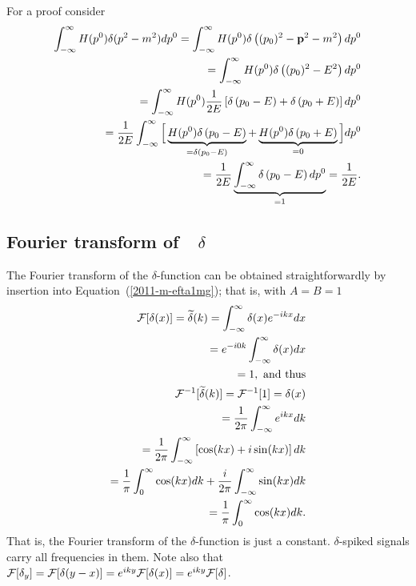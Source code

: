 {\color{OliveGreen}
\bproof
For a proof consider
 \begin{equation}
 \begin{split}
\int_{-\infty}^\infty     H (p^0)\delta (p^2-m^2)  dp^0
=
\int_{-\infty}^\infty    H (p^0)\delta \left((p_0)^2-{\bf p}^2-m^2\right) dp^0\\
=
\int_{-\infty}^\infty   H (p^0)\delta \left((p_0)^2-E^2\right)  dp^0  \\
=
\int_{-\infty}^\infty   H (p^0)\frac{1}{2E} \left[\delta \left( p_0 - E \right) + \delta \left( p_0 + E \right) \right]  dp^0 \\
=
\frac{1}{2E} \int_{-\infty}^\infty   \Big[\underbrace{H (p^0) \delta \left( p_0 - E \right)}_{=\delta \left( p_0 - E \right)}
 +
\underbrace{H (p^0) \delta \left( p_0 + E \right)}_{=0}
\Big] dp^0\\
=  \frac{1}{2E} \underbrace{\int_{-\infty}^\infty   \delta \left( p_0 - E \right)  dp^0}_{=1} =\frac{1}{2E}
.
\end{split}
 \end{equation}
\eproof
}


\subsection{Fourier transform of~~$\delta$}
The Fourier transform of the $\delta$-function can be obtained straightforwardly
by insertion into Equation~(\ref{2011-m-efta1mg});   that is,
with $A=B=1$
\begin{equation}
\begin{split}
  {\cal F}[\delta (x)]=\widetilde{\delta}(k)=   \int_{-\infty}^\infty  \delta(x) e^{-i{kx}} dx   \\
  =    e^{-i{0k}}  \int_{-\infty}^\infty  \delta(x)  dx   \\
  =    1, \textrm{ and thus}
\\
 {\cal F}^{-1}[\widetilde{\delta} (k)]=
 {\cal F}^{-1}[1]=\delta (x)  \\
  = \frac{1}{2\pi}  \int_{-\infty}^\infty    e^{i{kx}} dk\\
  =
\frac{1}{2\pi}  \int_{-\infty}^\infty  \left[  \cos(kx)+ i \sin(kx) \right] dk\\
  =
\frac{1}{ \pi}  \int_{0}^\infty    \cos(kx) dk   +
\frac{ i }{2\pi}  \int_{-\infty}^\infty   \sin(kx)   dk\\
  =
\frac{1}{ \pi}  \int_{0}^\infty    \cos(kx) dk
.
\end{split}
\label{2011-m-eftdelta}
\end{equation}
That is, the Fourier transform of the $\delta$-function is just a constant.
$\delta$-spiked signals carry all frequencies in them.
Note also that  ${\cal F}[\delta_y ]={\cal F}[\delta  (y-x)]=e^{i{ky}}{\cal F}[\delta (x)]=e^{i{ky}}{\cal F}[\delta ]$.

